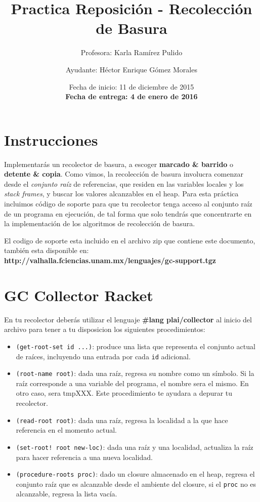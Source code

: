 \documentclass{article}
\author{Profesora: Karla Ramírez Pulido \and
  Ayudante: Héctor Enrique Gómez Morales}
\title{Practica Reposición - Recolección de Basura}
\date{Fecha de inicio: 11 de diciembre de 2015\\
  \textbf{Fecha de entrega: 4 de enero de 2016}}
\begin{document}
\maketitle
\section{Instrucciones}
Implementarás un recolector de basura, a escoger \textbf{marcado & barrido} o \textbf{detente & copia}.
Como vimos, la recolección de basura involucra comenzar desde el \textit{conjunto raíz} de referencias,
que residen en las variables locales y los \textit{stack frames}, y buscar los valores alcanzables en el heap.
Para esta práctica incluimos código de soporte para que tu recolector tenga acceso al conjunto raíz de un
programa en ejecución, de tal forma que solo tendrás que concentrarte en la implementación de los algoritmos de
recolección de basura.

El codigo de soporte esta incluido en el archivo zip que contiene este documento, también esta disponible
en: \textbf{http://valhalla.fciencias.unam.mx/lenguajes/gc-support.tgz}

\section*{GC Collector Racket}
En tu recolector deberás utilizar el lenguaje \textbf{#lang plai/collector} al inicio del archivo
para tener a tu disposicion los siguientes procedimientos:

\begin{itemize}
\item \verb;(get-root-set id ...);: produce una lista que representa el conjunto actual de raíces, incluyendo
  una entrada por cada \verb;id; adicional.
\item \verb;(root-name root);: dada una raíz, regresa su nombre como un símbolo. Si la raíz corresponde a una
  variable del programa, el nombre sera el mismo. En otro caso, sera tmpXXX. Este procedimiento te ayudara a
  depurar tu recolector.
\item \verb;(read-root root);: dada una raíz, regresa la localidad a la que hace referencia en el momento
  actual.
\item \verb;(set-root! root new-loc);: dada una raíz y una localidad, actualiza la raíz para hacer referencia
  a una nueva localidad.
\item \verb;(procedure-roots proc);: dado un closure almacenado en el heap, regresa el conjunto raíz que es
  alcanzable desde el ambiente del closure, si el \verb;proc; no es alcanzable, regresa la lista vacía.
\end{itemize}
\end{document}
